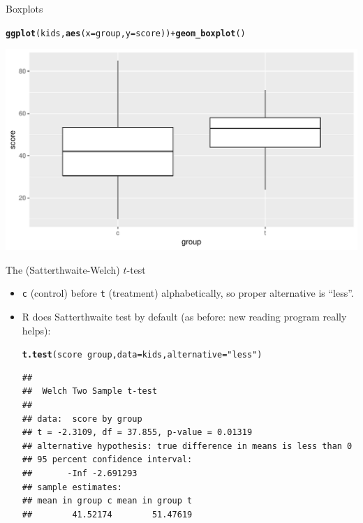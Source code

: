 \documentclass[unknownkeysallowed]{beamer}\usepackage[]{graphicx}\usepackage[]{color}
\makeatletter
\def\maxwidth{ %
  \ifdim\Gin@nat@width>\linewidth
    \linewidth
  \else
    \Gin@nat@width
  \fi
}
\newcommand{\hlstr}[1]{\textcolor[rgb]{0.192,0.494,0.8}{#1}}%
\newcommand{\hlopt}[1]{\textcolor[rgb]{0,0,0}{#1}}%
\newcommand{\hlstd}[1]{\textcolor[rgb]{0.345,0.345,0.345}{#1}}%
\newcommand{\hlkwc}[1]{\textcolor[rgb]{0.333,0.667,0.333}{#1}}%
\newcommand{\hlkwd}[1]{\textcolor[rgb]{0.737,0.353,0.396}{\textbf{#1}}}%
\newenvironment{kframe}{%
 \def\at@end@of@kframe{}%
 \ifinner\ifhmode%
  \def\at@end@of@kframe{\end{minipage}}%
  \begin{minipage}{\columnwidth}%
 \fi\fi%
 \def\FrameCommand##1{\hskip\@totalleftmargin \hskip-\fboxsep
 \colorbox{shadecolor}{##1}\hskip-\fboxsep
     \hskip-\linewidth \hskip-\@totalleftmargin \hskip\columnwidth}%
 \MakeFramed {\advance\hsize-\width
   \@totalleftmargin\z@ \linewidth\hsize
   \@setminipage}}%
 {\par\unskip\endMakeFramed%
 \at@end@of@kframe}
\newenvironment{knitrout}{}{} %
\makeatother
\begin{document}
\begin{frame}[fragile]{Boxplots}
  
\begin{knitrout}
\color{fgcolor}\begin{kframe}
\begin{alltt}
\hlkwd{ggplot}\hlstd{(kids,}\hlkwd{aes}\hlstd{(}\hlkwc{x}\hlstd{=group,}\hlkwc{y}\hlstd{=score))}\hlopt{+}\hlkwd{geom_boxplot}\hlstd{()}
\end{alltt}
\end{kframe}
\includegraphics[width=\maxwidth]{figure/unnamed-chunk-54-1} 

\end{knitrout}
  
\end{frame}

\begin{frame}[fragile]{The (Satterthwaite-Welch) $t$-test}
  
  \begin{itemize}
  \item \texttt{c} (control) before \texttt{t} (treatment)
    alphabetically, so proper alternative is ``less''.
  \item R does Satterthwaite test by default (as before: new reading program really helps):


\begin{knitrout}\footnotesize
{}\color{fgcolor}\begin{kframe}
\begin{alltt}
\hlkwd{t.test}\hlstd{(score}\hlopt{~}\hlstd{group,}\hlkwc{data}\hlstd{=kids,}\hlkwc{alternative}\hlstd{=}\hlstr{"less"}\hlstd{)}
\end{alltt}
\begin{verbatim}
## 
## 	Welch Two Sample t-test
## 
## data:  score by group
## t = -2.3109, df = 37.855, p-value = 0.01319
## alternative hypothesis: true difference in means is less than 0
## 95 percent confidence interval:
##       -Inf -2.691293
## sample estimates:
## mean in group c mean in group t 
##        41.52174        51.47619
\end{verbatim}
\end{kframe}
\end{knitrout}
  \end{itemize}
  
\end{frame}
\end{document}
